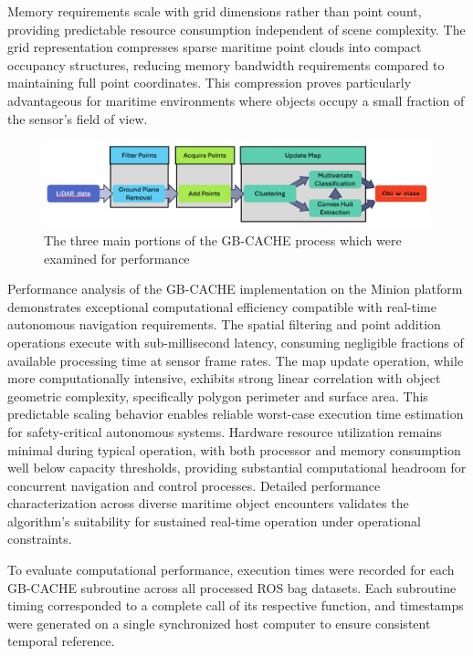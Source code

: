 \documentclass{erauthesis}
\begin{document}
Memory requirements scale with grid dimensions rather than point count, providing predictable resource consumption independent of scene complexity.
The grid representation compresses sparse maritime point clouds into compact occupancy structures, reducing memory bandwidth requirements compared to maintaining full point coordinates.
This compression proves particularly advantageous for maritime environments where objects occupy a small fraction of the sensor's field of view.

\begin{figure}
    \centering
    \includegraphics[width=0.95\linewidth]{Images/gbcache_flow.png}
    \caption{The three main portions of the GB-CACHE process which were examined for performance}
    \label{fig:gbcache_flow_analysis}
\end{figure}

Performance analysis of the \ac{GB-CACHE} implementation on the Minion platform demonstrates exceptional computational efficiency compatible with real-time autonomous navigation requirements.
The spatial filtering and point addition operations execute with sub-millisecond latency, consuming negligible fractions of available processing time at sensor frame rates.
The map update operation, while more computationally intensive, exhibits strong linear correlation with object geometric complexity, specifically polygon perimeter and surface area.
This predictable scaling behavior enables reliable worst-case execution time estimation for safety-critical autonomous systems.
Hardware resource utilization remains minimal during typical operation, with both processor and memory consumption well below capacity thresholds, providing substantial computational headroom for concurrent navigation and control processes.
Detailed performance characterization across diverse maritime object encounters validates the algorithm's suitability for sustained real-time operation under operational constraints.

To evaluate computational performance, execution times were recorded for each GB-CACHE subroutine across all processed ROS bag datasets. 
Each subroutine timing corresponded to a complete call of its respective function, and timestamps were generated on a single synchronized host computer to ensure consistent temporal reference.
\end{document}
